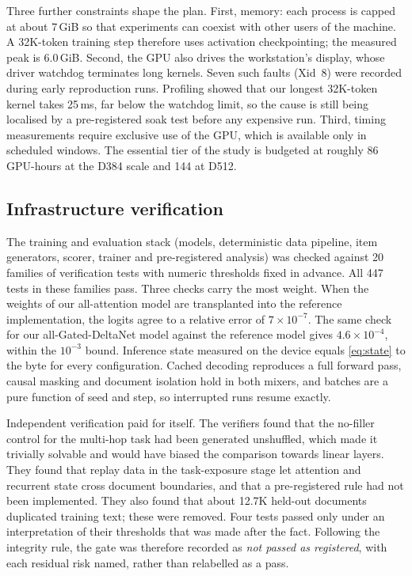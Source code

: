 \documentclass[10pt,a4paper]{article}
\begin{document}
Three further constraints shape the plan. First, memory: each process is capped at about 7\,GiB so
that experiments can coexist with other users of the machine. A 32K-token training step therefore
uses activation checkpointing; the measured peak is 6.0\,GiB. Second, the GPU also drives the
workstation's display, whose driver watchdog terminates long kernels. Seven such faults (Xid~8) were
recorded during early reproduction runs. Profiling showed that our longest 32K-token kernel takes
25\,ms, far below the watchdog limit, so the cause is still being localised by a pre-registered soak
test before any expensive run. Third, timing measurements require exclusive use of the GPU, which
is available only in scheduled windows. The essential tier of the study is budgeted at roughly 86
GPU-hours at the D384 scale and 144 at D512.

\subsection{Infrastructure verification}
The training and evaluation stack (models, deterministic data pipeline, item generators, scorer,
trainer and pre-registered analysis) was checked against 20 families of verification tests with
numeric thresholds fixed in advance. All 447 tests in these families pass. Three checks carry the
most weight. When the weights of our all-attention model are transplanted into the reference
 implementation, the logits agree to a relative error of $7\times10^{-7}$.
The same check for our all-Gated-DeltaNet model against the reference  model gives
$4.6\times10^{-4}$, within the $10^{-3}$ bound. Inference state measured on the device equals
\cref{eq:state} to the byte for every configuration. Cached decoding reproduces a full forward pass,
causal masking and document isolation hold in both mixers, and batches are a pure function of seed
and step, so interrupted runs resume exactly.

Independent verification paid for itself. The verifiers found that the no-filler control for the
multi-hop task had been generated unshuffled, which made it trivially solvable and would have biased
the comparison towards linear layers. They found that replay data in the task-exposure stage let
attention and recurrent state cross document boundaries, and that a pre-registered rule had not been
implemented. They also found that about 12.7K held-out documents duplicated training text; these were
removed. Four tests passed only under an interpretation of their thresholds that was made after the
fact. Following the integrity rule, the gate was therefore recorded as \emph{not passed as
registered}, with each residual risk named, rather than relabelled as a pass.
\end{document}

